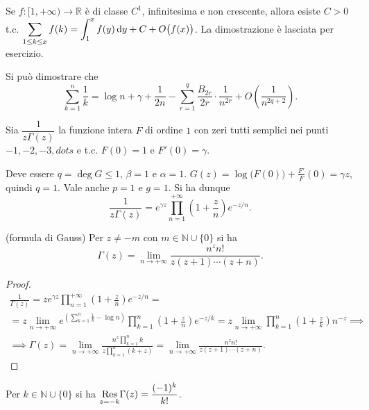 \begin{oss}
  Se $f:[1,+\infty) \longrightarrow \mathbb{R}$ è di classe $C^1$, infinitesima e non crescente, allora esiste $C>0$ t.c. $\displaystyle \sum_{1 \le k \le x} f(k)=\int_1^x f(y)\mathop{}\!\mathrm{d} y+C+O\big(f(x)\big)$. La dimostrazione è lasciata per esercizio.
\end{oss}

\begin{oss}
  Si può dimostrare che
  $$\sum_{k=1}^n \frac{1}{k}=\log{n}+\gamma+\frac{1}{2n}-\sum_{r=1}^q \frac{B_{2r}}{2r}\cdot\frac{1}{n^{2r}}+O\left(\frac{1}{n^{2q+2}}\right).$$
\end{oss}

\begin{defn}
  Sia $\dfrac{1}{z\Gamma(z)}$ la funzione intera $F$ di ordine $1$ con zeri tutti semplici nei punti $-1,-2,-3,dots$ e t.c. $F(0)=1$ e $F'(0)=\gamma$.
\end{defn}

Deve essere $q=\deg{G} \le 1$, $\beta=1$ e $\alpha=1$. $G(z)=\log\big(F(0)\big)+\frac{F'}{F}(0)=\gamma z$, quindi $q=1$. Vale anche $p=1$ e $g=1$. Si ha dunque
$$\frac{1}{z\Gamma(z)}=e^{\gamma z}\prod_{n=1}^{+\infty}\left(1+\frac{z}{n}\right)e^{-z/n}.$$

\begin{prop}
  (formula di Gauss) Per $z\not=-m$ con $m \in \mathbb{N}\cup\{0\}$ si ha
  \begin{equation}
    \Gamma(z)=\lim_{n \longrightarrow +\infty} \frac{n^zn!}{z(z+1)\cdots(z+n)}.
  \end{equation}
\end{prop}

\begin{proof}
  \begin{gather*}
    \frac{1}{\Gamma(z)}=ze^{\gamma z}\prod_{n=1}^{+\infty}\left(1+\frac{z}{n}\right)e^{-z/n}=\\
    =z\lim_{n \longrightarrow +\infty} e^{\left(\sum_{k=1}^n\frac{1}{k}-\log{n}\right)}\prod_{k=1}^n\left(1+\frac{z}{n}\right)e^{-z/k}=z\lim_{n \longrightarrow +\infty} \prod_{k=1}^n\left(1+\frac{z}{k}\right)n^{-z} \implies \\
    \implies \Gamma(z)=\lim_{n \longrightarrow +\infty} \frac{n^z\prod_{k=1}^n k}{z\prod_{k=1}^n (k+z)}=\lim_{n \longrightarrow +\infty} \frac{n^zn!}{z(z+1)\cdots(z+n)}.
  \end{gather*}
\end{proof}

\begin{prop}
  Per $k \in \mathbb{N}\cup\{0\}$ si ha $\underset{z=-k}{\normalfont{\text{Res}}}\Gamma(z)=\dfrac{(-1)^k}{k!}$.
\end{prop}

